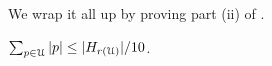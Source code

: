 {%
% 
% 

We wrap it all up by proving part (ii) of .

\begin{claim} $\sum_{p \in {\cal U}} |p| \leq |H_{r({\cal U})}|/10$.
\end{claim}

% 

}

